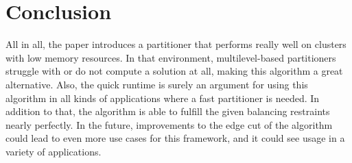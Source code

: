 \documentclass[acmsmall,nonacm,screen,review]{acmart}
\begin{document}
\section{Conclusion}
All in all, the paper introduces a partitioner that performs really well on clusters with low memory resources. In that environment, multilevel-based partitioners struggle with or do not compute a solution at all, making this algorithm a great alternative. Also, the quick runtime is surely an argument for using this algorithm in all kinds of applications where a fast partitioner is needed. In addition to that, the algorithm is able to fulfill the given balancing restraints nearly perfectly. In the future, improvements to the edge cut of the algorithm could lead to even more use cases for this framework, and it could see usage in a variety of applications.


\end{document}
